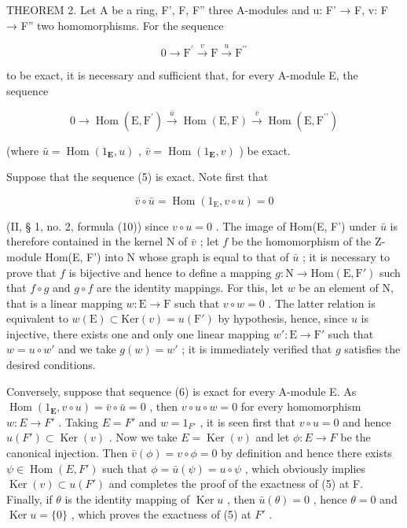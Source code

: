 THEOREM 2. Let A be a ring, F', F, F'' three A-modules and u: F' → F, v: F → F'' two homomorphisms. For the sequence

\[
0 \longrightarrow \mathrm{F} ^ {\prime} \stackrel {v} {\longrightarrow} \mathrm{F} \stackrel {u} {\longrightarrow} \mathrm{F} ^ {\prime \prime}\tag{5}
\]

to be exact, it is necessary and sufficient that, for every A-module E, the sequence

\[
0 \longrightarrow \operatorname{Hom} (\mathrm{E}, \mathrm{F} ^ {\prime}) \stackrel {\bar {u}} {\longrightarrow} \operatorname{Hom} (\mathrm{E}, \mathrm{F}) \stackrel {\bar {v}} {\longrightarrow} \operatorname{Hom} (\mathrm{E}, \mathrm{F} ^ {\prime \prime})\tag{6}
\]

(where \(\bar{u} = \operatorname{Hom}(1_{\mathbf{E}}, u)\) , \(\bar{v} = \operatorname{Hom}(1_{\mathbf{E}}, v)\) ) be exact.

Suppose that the sequence (5) is exact. Note first that

\[
\bar {v} \circ \bar {u} = \operatorname{Hom} (1 _ {\mathrm{E}}, v \circ u) = 0
\]

(II, § 1, no. 2, formula (10)) since \(v \circ u = 0\) . The image of Hom(E, F') under \(\bar{u}\) is therefore contained in the kernel N of \(\bar{v}\) ; let \(f\) be the homomorphism of the Z-module Hom(E, F') into N whose graph is equal to that of \(\bar{u}\) ; it is necessary to prove that \(f\) is bijective and hence to define a mapping \(g: \mathrm{N} \to \mathrm{Hom}(\mathrm{E}, \mathrm{F}')\) such that \(f \circ g\) and \(g \circ f\) are the identity mappings. For this, let \(w\) be an element of N, that is a linear mapping \(w: \mathrm{E} \to \mathrm{F}\) such that \(v \circ w = 0\) . The latter relation is equivalent to \(w(\mathrm{E}) \subset \mathrm{Ker}(v) = u(\mathrm{F}')\) by hypothesis, hence, since \(u\) is injective, there exists one and only one linear mapping \(w': \mathrm{E} \to \mathrm{F}'\) such that \(w = u \circ w'\) and we take \(g(w) = w'\) ; it is immediately verified that \(g\) satisfies the desired conditions.

Conversely, suppose that sequence (6) is exact for every A-module E. As \(\operatorname{Hom}(1_{\mathbf{E}}, v \circ u) = \bar{v} \circ \bar{u} = 0\) , then \(v \circ u \circ w = 0\) for every homomorphism \(w: E \to F'\) . Taking \(E = F'\) and \(w = 1_{F'}\) , it is seen first that \(v \circ u = 0\) and hence \(u(F') \subset \operatorname{Ker}(v)\) . Now we take \(E = \operatorname{Ker}(v)\) and let \(\phi: E \to F\) be the canonical injection. Then \(\bar{v}(\phi) = v \circ \phi = 0\) by definition and hence there exists \(\psi \in \operatorname{Hom}(E, F')\) such that \(\phi = \bar{u}(\psi) = u \circ \psi\) , which obviously implies \(\operatorname{Ker}(v) \subset u(F')\) and completes the proof of the exactness of (5) at F. Finally, if \(\theta\) is the identity mapping of \(\operatorname{Ker} u\) , then \(\bar{u}(\theta) = 0\) , hence \(\theta = 0\) and \(\operatorname{Ker} u = \{0\}\) , which proves the exactness of (5) at \(F'\) .

